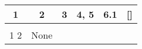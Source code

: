 \documentclass{article}
\begin{document}
\begin{center}
\begin{tabular}{ |c|c|c|c|c|c| }
\hline
1 & 2 & 3 & 4, 5 & 6.1 & [] \\
\hline
 &  &  &  &  &  \\
\hline
1
2 & None &  &  &  &  \\
\hline
\end{tabular}
\end{center}
\end{document}
